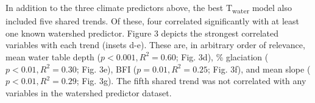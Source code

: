 \documentclass{article}
\begin{document}

In addition to the three climate predictors above, the best T\textsubscript{water} model also included five shared trends. Of these, four correlated significantly with at least one known watershed predictor. Figure 3 depicts the strongest correlated variables with each trend (insets d-e). These are, in arbitrary order of relevance, mean water table depth ($p<0.001, R^2=0.60$; Fig. 3d), \% glaciation ($p<0.01, R^2=0.30$; Fig. 3e), BFI ($p=0.01, R^2=0.25$; Fig. 3f), and mean slope ($p<0.01, R^2=0.29$; Fig. 3g). The fifth shared trend was not correlated with any variables in the watershed predictor dataset.
\end{document}

